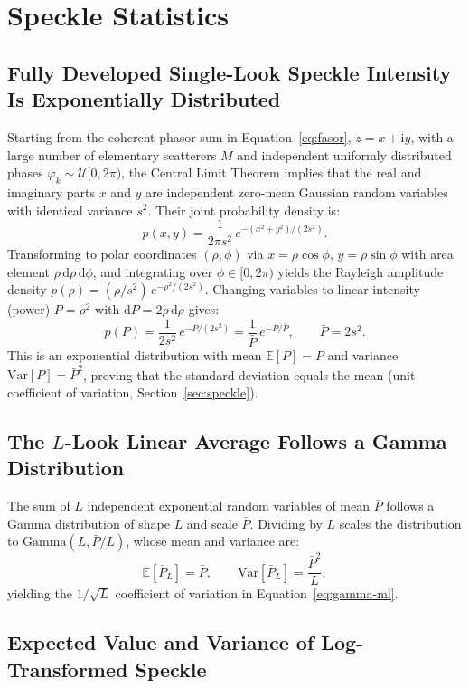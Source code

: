 \documentclass[11pt,a4paper]{article}
\newcommand{\dd}{\mathrm d}
\begin{document}
\section{Speckle Statistics}
\label{sec:der-speckle}

\subsection{Fully Developed Single-Look Speckle Intensity Is Exponentially Distributed}

Starting from the coherent phasor sum in Equation~\eqref{eq:fasor}, $z=x+\mathrm{i}y$, with a large number of elementary scatterers $M$ and independent uniformly distributed phases $\varphi_k \sim \mathcal{U}[0,2\pi)$, the Central Limit Theorem implies that the real and imaginary parts $x$ and $y$ are independent zero-mean Gaussian random variables with identical variance $s^2$. Their joint probability density is:
\[
  p(x,y)=\frac{1}{2\pi s^2}\,e^{-(x^2+y^2)/(2s^2)} .
\]
Transforming to polar coordinates $(\rho,\phi)$ via $x=\rho\cos\phi$, $y=\rho\sin\phi$ with area element $\rho\,\dd\rho\,\dd\phi$, and integrating over $\phi\in[0,2\pi)$ yields the Rayleigh amplitude density $p(\rho)=(\rho/s^2)\,e^{-\rho^2/(2s^2)}$. Changing variables to linear intensity (power) $P=\rho^2$ with $\dd P=2\rho\,\dd\rho$ gives:
\begin{equation}
  p(P)=\frac{1}{2s^2}\,e^{-P/(2s^2)}=\frac{1}{\bar{P}}\,e^{-P/\bar{P}},
  \qquad \bar{P}=2s^2 .
  \label{eq:der-exp}
\end{equation}
This is an exponential distribution with mean $\mathbb{E}[P]=\bar{P}$ and variance $\mathrm{Var}[P]=\bar{P}^2$, proving that the standard deviation equals the mean (unit coefficient of variation, Section~\ref{sec:speckle}).

\subsection{The $L$-Look Linear Average Follows a Gamma Distribution}

The sum of $L$ independent exponential random variables of mean $\bar{P}$ follows a Gamma distribution of shape $L$ and scale $\bar{P}$. Dividing by $L$ scales the distribution to $\mathrm{Gamma}(L, \bar{P}/L)$, whose mean and variance are:
\[
  \mathbb{E}[\bar P_L]=\bar{P},\qquad
  \mathrm{Var}[\bar P_L]=\frac{\bar{P}^2}{L},
\]
yielding the $1/\sqrt L$ coefficient of variation in Equation~\eqref{eq:gamma-ml}.

\subsection{Expected Value and Variance of Log-Transformed Speckle}
\end{document}
